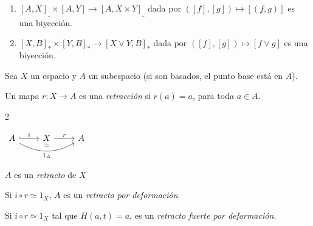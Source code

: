 \begin{tcolorbox}[colback=blue!5!white,colframe=blue!75!blue,title=\textbf{Corolario}.]
    \begin{enumerate}[noitemsep, topsep=0pt]
        \item \([A, X]_\_\times [A, Y]\to[A, X\times Y]_\_\) dada por \(([f], [g])\mapsto [(f, g)]\) es una biyección.
        \item \([X, B]_\ast\times [Y, B]_\ast\to[X\vee Y, B]_\ast\) dada por \(([f], [g])\mapsto [f \vee g]\) es una biyección.
    \end{enumerate}
\end{tcolorbox}

\begin{tcolorbox}[colback=blue-violet!5!white,colframe=blue-violet!75!black,title=\textbf{Definición}.\index{retracción}]
    Sea \(X\) un espacio y \(A\) un subespacio (si son basados, el punto base está en \(A\)).

    Un mapa \(r\colon X\to A\) es una \textit{retracción} si \(r(a)=a\), para toda \(a\in A\).



\begin{multicols}{2}

\begin{center}
    \(\begin{tikzcd}
        A \arrow[r, hookrightarrow]{}{i}
        \arrow[rr, bend right=30, swap]{}{1_A}
        \arrow[rr, bend right=10, draw=none, swap]{}{=}
        & X \arrow[r]{}{r} & A
    \end{tikzcd}\)
\end{center}

\columnbreak
        \(A\) es un \textit{retracto} de \(X\)
\end{multicols}



\tcblower
    Si \(i\circ r\simeq 1_{X}\), \(A\) es un \textit{retracto por deformación}.

    Si \(i\circ r\simeq 1_{X}\) tal que \(H(a, t)=a\),  es un \textit{retracto fuerte por deformación}.
\end{tcolorbox}


